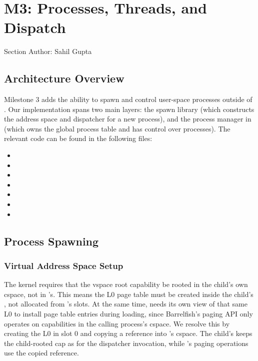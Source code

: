 \chapter*{M3: Processes, Threads, and Dispatch}{Section Author: Sahil Gupta}
\section{Architecture Overview}

Milestone 3 adds the ability to spawn and control user-space processes outside of .
Our implementation spans two main layers: the spawn library (which constructs the
address space and dispatcher for a new process), and the process manager in
 (which owns the global process table and has control over processes). The
relevant code can be found in the following files:

\begin{itemize}
    \itemsep-0.5em
    \item {}
    \item {}
    \item {}
    \item {}
    \item {}
    \item {}
    \item {}
\end{itemize}

\section{Process Spawning}

\subsection{Virtual Address Space Setup}

The kernel requires that the vspace root capability be rooted in the child's own
cspace, not in 's. This means the L0 page table must be created inside
the child's , not allocated from 's slots. At the same time,
 needs its own view of that same L0 to install page table entries during
loading, since Barrelfish's paging API only operates on capabilities in the
calling process's cspace. We resolve this by creating the L0 in 
slot 0 and copying a reference into 's cspace. The child's
 keeps the child-rooted cap as  for the dispatcher
invocation, while 's paging operations use the copied reference.

